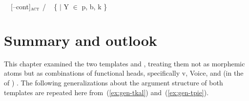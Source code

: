 \begin{exe}
\begin{xlist}
\begin{exe}
\begin{xlist}
\begin{exe}
\begin{xlist}
\begin{exe}
\begin{exe}
\begin{xlist}
\begin{exe}
\begin{xlist}
\begin{exe}
\begin{xlist}
\begin{exe}
\begin{xlist}
\begin{exe}
\begin{xlist}
\begin{exe}
\begin{xlist}
\begin{exe}
\begin{xlist}
\begin{exe}
\begin{xlist}
\begin{exe}
\begin{xlist}
\begin{exe}
\begin{xlist}
\begin{exe}
\begin{xlist}
\begin{exe}
\begin{xlist}
\begin{exe}
\begin{exe}
\begin{xlist}
\begin{exe}
\begin{xlist}
\begin{exe}
\begin{xlist}
\begin{exe}
\begin{xlist}
{\begin{exe}
\begin{xlist}
\begin{exe}
\begin{xlist}
\begin{exe}
\begin{xlist}
\begin{exe}
\begin{xlist}
\begin{xlist}
\begin{xlist}
\begin{exe}
\begin{xlist}
\begin{xlist}
\begin{xlist}
\begin{exe}
\begin{exe}
\begin{xlist}
\begin{exe}
\begin{xlist}
\begin{exe}
\begin{xlist}
\begin{exe}
\begin{xlist}
\begin{exe}
\begin{xlist}
\begin{exe}
\begin{xlist}
\begin{exe}
\begin{exe}
\begin{xlist}
\begin{xlist}
\begin{exe}
\begin{xlist}
\begin{exe}
\begin{xlist}
\begin{exe}
\begin{xlist}
\begin{exe}
\begin{xlist}
\begin{exe}
\begin{xlist}
\begin{exe}
\begin{xlist}
\begin{exe}
\begin{exe}
\begin{xlist}
\begin{exe}
\begin{xlist}
\begin{exe}
\begin{xlist}
\begin{exe}
\begin{xlist}
\begin{exe}
\begin{xlist}
\begin{exe}
\begin{xlist}
\begin{exe}
\begin{xlist}
\begin{exe}
\begin{xlist}
\begin{exe}
\begin{xlist}
	\ex  \label{vi:va}\va~\lra~[--cont]$_{\gsc{ACT}}$ / \trace~ \{  $|$ Y $\in$ p, b, k \} 
			
 \z
\z 

\section{Summary and outlook} \label{voice:conc}
This chapter examined the two templates {\tkal} and {\tpie}, treating them not as morphemic atoms but as combinations of functional heads, specifically v, Voice, and (in the  of {\tpie}) {\va}. The following generalizations about the argument structure of both templates are repeated here from~(\ref{ex:gen-tkal}) and~(\ref{ex:gen-tpie}).

\end{xlist}
\end{exe}
\end{xlist}
\end{exe}
\end{xlist}
\end{exe}
\end{xlist}
\end{exe}
\end{xlist}
\end{exe}
\end{xlist}
\end{exe}
\end{xlist}
\end{exe}
\end{xlist}
\end{exe}
\end{xlist}
\end{exe}
\end{exe}
\end{xlist}
\end{exe}
\end{xlist}
\end{exe}
\end{xlist}
\end{exe}
\end{xlist}
\end{exe}
\end{xlist}
\end{exe}
\end{xlist}
\end{exe}
\end{xlist}
\end{xlist}
\end{exe}
\end{exe}
\end{xlist}
\end{exe}
\end{xlist}
\end{exe}
\end{xlist}
\end{exe}
\end{xlist}
\end{exe}
\end{xlist}
\end{exe}
\end{xlist}
\end{exe}
\end{exe}
\end{xlist}
\end{xlist}
\end{xlist}
\end{exe}
\end{xlist}
\end{xlist}
\end{xlist}
\end{exe}
\end{xlist}
\end{exe}
\end{xlist}
\end{exe}
\end{xlist}
\end{exe}}
\end{xlist}
\end{exe}
\end{xlist}
\end{exe}
\end{xlist}
\end{exe}
\end{xlist}
\end{exe}
\end{exe}
\end{xlist}
\end{exe}
\end{xlist}
\end{exe}
\end{xlist}
\end{exe}
\end{xlist}
\end{exe}
\end{xlist}
\end{exe}
\end{xlist}
\end{exe}
\end{xlist}
\end{exe}
\end{xlist}
\end{exe}
\end{xlist}
\end{exe}
\end{xlist}
\end{exe}
\end{xlist}
\end{exe}
\end{xlist}
\end{exe}
\end{exe}
\end{xlist}
\end{exe}
\end{xlist}
\end{exe}
\end{xlist}
\end{exe}
